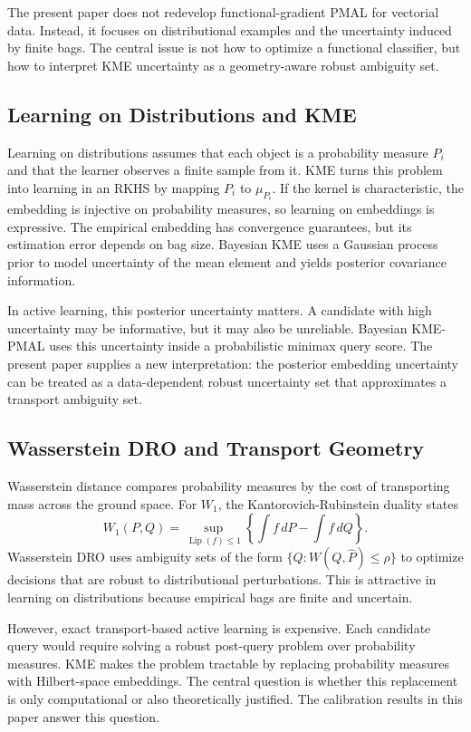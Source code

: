 \documentclass[10pt,journal]{IEEEtran}
\DeclareMathOperator{\Lip}{Lip}
\newcommand{\wh}{\widehat}
\begin{document}
The present paper does not redevelop functional-gradient PMAL for vectorial data. Instead, it focuses on distributional examples and the uncertainty induced by finite bags. The central issue is not how to optimize a functional classifier, but how to interpret KME uncertainty as a geometry-aware robust ambiguity set.

\subsection{Learning on Distributions and KME}

Learning on distributions assumes that each object is a probability measure $P_i$ and that the learner observes a finite sample from it. KME turns this problem into learning in an RKHS by mapping $P_i$ to $\mu_{P_i}$. If the kernel is characteristic, the embedding is injective on probability measures, so learning on embeddings is expressive. The empirical embedding has convergence guarantees, but its estimation error depends on bag size. Bayesian KME uses a Gaussian process prior to model uncertainty of the mean element and yields posterior covariance information.

In active learning, this posterior uncertainty matters. A candidate with high uncertainty may be informative, but it may also be unreliable. Bayesian KME-PMAL uses this uncertainty inside a probabilistic minimax query score. The present paper supplies a new interpretation: the posterior embedding uncertainty can be treated as a data-dependent robust uncertainty set that approximates a transport ambiguity set.

\subsection{Wasserstein DRO and Transport Geometry}

Wasserstein distance compares probability measures by the cost of transporting mass across the ground space. For $W_1$, the Kantorovich-Rubinstein duality states
\begin{equation}
    W_1(P,Q)=\sup_{\Lip(f)\le 1}\left\{\int f\,dP-\int f\,dQ\right\}.
\end{equation}
Wasserstein DRO uses ambiguity sets of the form $\{Q:W(Q,\wh P)\le \rho\}$ to optimize decisions that are robust to distributional perturbations. This is attractive in learning on distributions because empirical bags are finite and uncertain.

However, exact transport-based active learning is expensive. Each candidate query would require solving a robust post-query problem over probability measures. KME makes the problem tractable by replacing probability measures with Hilbert-space embeddings. The central question is whether this replacement is only computational or also theoretically justified. The calibration results in this paper answer this question.
\end{document}
